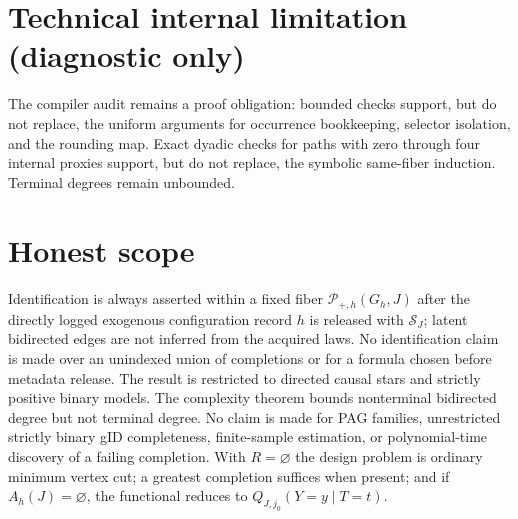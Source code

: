\documentclass{article}
\begin{document}
\section*{Technical internal limitation (diagnostic only)}

The compiler audit remains a proof obligation: bounded checks support, but do not replace, the uniform arguments for occurrence bookkeeping, selector isolation, and the rounding map. Exact dyadic checks for paths with zero through four internal proxies support, but do not replace, the symbolic same-fiber induction. Terminal degrees remain unbounded.

\section{Honest scope}

Identification is always asserted within a fixed fiber \(\mathcal P_{+,h}(G_h,J)\) after the directly logged exogenous configuration record \(h\) is released with \(\mathcal S_J\); latent bidirected edges are not inferred from the acquired laws. No identification claim is made over an unindexed union of completions or for a formula chosen before metadata release. The result is restricted to directed causal stars and strictly positive binary models. The complexity theorem bounds nonterminal bidirected degree but not terminal degree. No claim is made for PAG families, unrestricted strictly binary gID completeness, finite-sample estimation, or polynomial-time discovery of a failing completion. With \(R=\varnothing\) the design problem is ordinary minimum vertex cut; a greatest completion suffices when present; and if \(A_h(J)=\varnothing\), the functional reduces to \(Q_{J,j_0}(Y=y\mid T=t)\).
\end{document}
